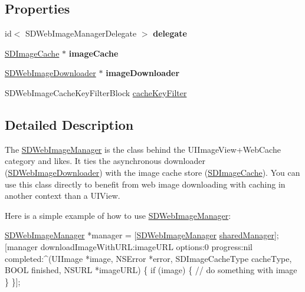 \subsection*{Properties}
\begin{DoxyCompactItemize}
\item 
\mbox{\label{interface_s_d_web_image_manager_a1f761970aaca069c34091bb593733415}} 
id$<$ S\+D\+Web\+Image\+Manager\+Delegate $>$ {\bfseries delegate}
\item 
\mbox{\label{interface_s_d_web_image_manager_acd0ecd2fe09383a4f51deb033d138baa}} 
\mbox{\hyperlink{interface_s_d_image_cache}{S\+D\+Image\+Cache}} $\ast$ {\bfseries image\+Cache}
\item 
\mbox{\label{interface_s_d_web_image_manager_a2cf6b99a994a897bb238d5f3771e7598}} 
\mbox{\hyperlink{interface_s_d_web_image_downloader}{S\+D\+Web\+Image\+Downloader}} $\ast$ {\bfseries image\+Downloader}
\item 
S\+D\+Web\+Image\+Cache\+Key\+Filter\+Block \mbox{\hyperlink{interface_s_d_web_image_manager_aa95a2fbd9decbe956b7b088075856010}{cache\+Key\+Filter}}
\end{DoxyCompactItemize}


\subsection{Detailed Description}
The \mbox{\hyperlink{interface_s_d_web_image_manager}{S\+D\+Web\+Image\+Manager}} is the class behind the U\+I\+Image\+View+\+Web\+Cache category and likes. It ties the asynchronous downloader (\mbox{\hyperlink{interface_s_d_web_image_downloader}{S\+D\+Web\+Image\+Downloader}}) with the image cache store (\mbox{\hyperlink{interface_s_d_image_cache}{S\+D\+Image\+Cache}}). You can use this class directly to benefit from web image downloading with caching in another context than a U\+I\+View.

Here is a simple example of how to use \mbox{\hyperlink{interface_s_d_web_image_manager}{S\+D\+Web\+Image\+Manager}}\+:


\begin{DoxyCode}
\mbox{\hyperlink{interface_s_d_web_image_manager}{SDWebImageManager}} *manager = [\mbox{\hyperlink{interface_s_d_web_image_manager}{SDWebImageManager}} 
      \mbox{\hyperlink{interface_s_d_web_image_manager_a03e60850e7f6da2aa38b7db870c93626}{sharedManager}}];
[manager downloadImageWithURL:imageURL
                      options:0
                     progress:nil
                    completed:^(UIImage *image, NSError *error, SDImageCacheType cacheType, BOOL finished, 
      NSURL *imageURL) \{
                        \textcolor{keywordflow}{if} (image) \{
                            \textcolor{comment}{// do something with image}
                        \}
                    \}];
\end{DoxyCode}
 


